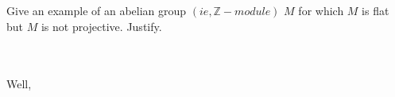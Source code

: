 Give an example of an abelian group $(ie, \mathbb{Z}-module)$ $M$ for which $M$ is flat but $M$ is not
projective. Justify.\\\\

\begin{solution}\renewcommand{\qedsymbol}{}\ \\
    Well,
\end{solution}